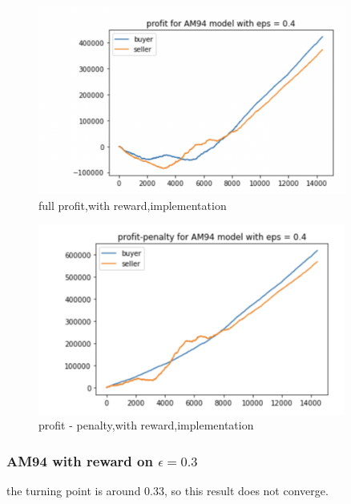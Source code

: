 \documentclass[11pt]{article}
\begin{document}
\begin{figure}[H]
	\begin{center}
	\includegraphics[width=0.9\textwidth]{11.PNG}
	\end{center}
	\caption{full profit,with reward,implementation}
	\label{FIG.11}
\end{figure}

\begin{figure}[H]
	\begin{center}
	\includegraphics[width=0.9\textwidth]{12.PNG}
	\end{center}
	\caption{profit - penalty,with reward,implementation}
	\label{FIG.12}
\end{figure}


\subsubsection{AM94 with reward on $\epsilon = 0.3$}
the turning point is around 0.33, so this result does not converge.
\end{document}
